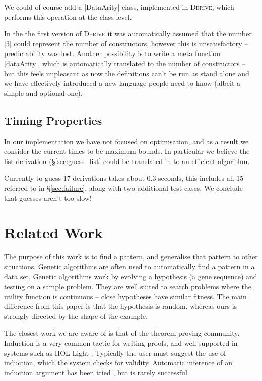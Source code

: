\documentclass[preprint,draft]{sigplanconf}
\newcommand{\derive}{\textsc{Derive}}
\begin{document}
We could of course add a |DataArity| class, implemented in \derive{}, which performs this operation at the class level.

In the the first version of \derive{} it was automatically assumed that the number |3| could represent the number of constructors, however this is unsatisfactory -- predictability was lost. Another possibility is to write a meta function |dataArity|, which is automatically translated to the number of constructors -- but this feels unpleasant as now the definitions can't be run as stand alone and we have effectively introduced a new language people need to know (albeit a simple and optional one).

\subsection{Timing Properties}

In our implementation we have not focused on optimisation, and as a result we consider the current times to be maximum bounds. In particular we believe the list derivation (\S\ref{sec:guess_list} could be translated in to an efficient algorithm.

Currently to guess 17 derivations takes about 0.3 seconds, this includes all 15 referred to in \S\ref{sec:failure}, along with two additional test cases. We conclude that guesses aren't too slow!

\section{Related Work}
\label{sec:related}


The purpose of this work is to find a pattern, and generalise that pattern to other situations. Genetic algorithms \cite{genetic_algorithms} are often used to automatically find a pattern in a data set. Genetic algorithms work by evolving a hypothesis (a gene sequence) and testing on a sample problem. They are well suited to search problems where the utility function is continuous -- close hypotheses have similar fitness. The main difference from this paper is that the hypothesis is random, whereas ours is strongly directed by the shape of the example.

The closest work we are aware of is that of the theorem proving community. Induction is a very common tactic for writing proofs, and well supported in systems such as HOL Light \cite{hol_light}. Typically the user must suggest the use of induction, which the system checks for validity. Automatic inference of an induction argument has been tried \cite{mintchev:reasoning}, but is rarely successful.
\end{document}
